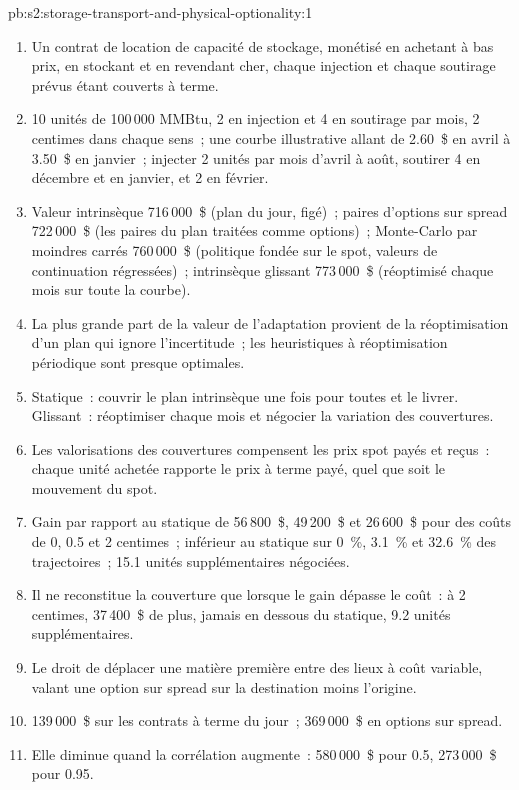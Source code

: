 \begin{solution}{pb:s2:storage-transport-and-physical-optionality:1}
\begin{enumerate}
\item Un contrat de location de capacité de stockage, monétisé en achetant à bas prix, en stockant et en revendant cher, chaque injection et chaque soutirage prévus étant couverts à terme.
\item 10 unités de 100\,000 MMBtu, 2 en injection et 4 en soutirage par mois, 2 centimes dans chaque sens~; une courbe illustrative allant de 2.60~\$ en avril à 3.50~\$ en janvier~; injecter 2
unités par mois d'avril à août, soutirer 4 en décembre et en janvier, et 2 en février.
\item Valeur intrinsèque 716\,000~\$ (plan du jour, figé)~; paires d'options sur spread 722\,000~\$ (les paires du plan traitées comme options)~; Monte-Carlo par moindres carrés 760\,000~\$
(politique fondée sur le spot, valeurs de continuation régressées)~; intrinsèque glissant 773\,000~\$ (réoptimisé chaque mois sur toute la courbe).
\item La plus grande part de la valeur de l'adaptation provient de la réoptimisation d'un plan qui ignore l'incertitude~; les heuristiques à réoptimisation périodique sont presque
optimales.
\item Statique~: couvrir le plan intrinsèque une fois pour toutes et le livrer. Glissant~: réoptimiser chaque mois et négocier la variation des couvertures.
\item Les valorisations des couvertures compensent les prix spot payés et reçus~: chaque unité achetée rapporte le prix à terme payé, quel que soit le mouvement du spot.
\item Gain par rapport au statique de 56\,800~\$, 49\,200~\$ et 26\,600~\$ pour des coûts de 0, 0.5 et 2 centimes~; inférieur au statique sur 0~\%, 3.1~\% et 32.6~\% des trajectoires~; 15.1 unités supplémentaires
négociées.
\item Il ne reconstitue la couverture que lorsque le gain dépasse le coût~: à 2 centimes, 37\,400~\$ de plus, jamais en dessous du statique, 9.2 unités supplémentaires.
\item Le droit de déplacer une matière première entre des lieux à coût variable, valant une option sur spread sur la destination moins l'origine.
\item 139\,000~\$ sur les contrats à terme du jour~; 369\,000~\$ en options sur spread.
\item Elle diminue quand la corrélation augmente~: 580\,000~\$ pour 0.5, 273\,000~\$ pour 0.95.

\end{enumerate}
\end{solution}
